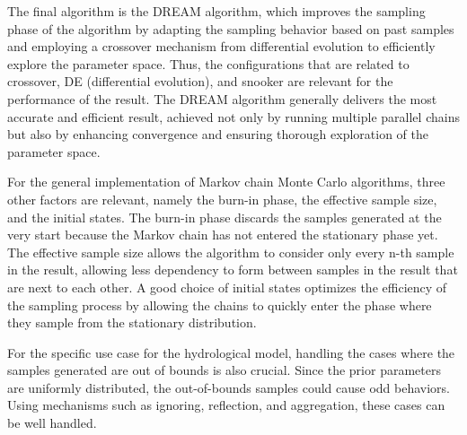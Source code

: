 The final algorithm is the DREAM algorithm, which improves the sampling phase of the algorithm by adapting the sampling behavior based on past samples and employing a crossover mechanism from differential evolution to efficiently explore the parameter space. Thus, the configurations that are related to crossover, DE (differential evolution), and snooker are relevant for the performance of the result. The DREAM algorithm generally delivers the most accurate and efficient result, achieved not only by running multiple parallel chains but also by enhancing convergence and ensuring thorough exploration of the parameter space.

For the general implementation of Markov chain Monte Carlo algorithms, three other factors are relevant, namely the burn-in phase, the effective sample size, and the initial states. The burn-in phase discards the samples generated at the very start because the Markov chain has not entered the stationary phase yet. The effective sample size allows the algorithm to consider only every n-th sample in the result, allowing less dependency to form between samples in the result that are next to each other. A good choice of initial states optimizes the efficiency of the sampling process by allowing the chains to quickly enter the phase where they sample from the stationary distribution.

For the specific use case for the hydrological model, handling the cases where the samples generated are out of bounds is also crucial. Since the prior parameters are uniformly distributed, the out-of-bounds samples could cause odd behaviors. Using mechanisms such as ignoring, reflection, and aggregation, these cases can be well handled.

